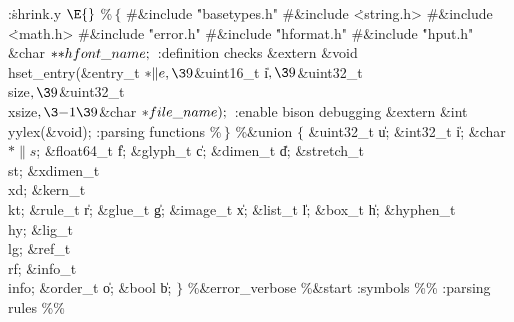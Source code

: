 \Y\B\4:\.{shrink.y }\X${}\E{}$\6
\8\%\raise 1pt\hbox{$\,\{$}\6
\8\#\&{include} \.{"basetypes.h"}\6
\8\#\&{include} \.{<string.h>}\6
\8\#\&{include} \.{<math.h>}\6
\8\#\&{include} \.{"error.h"}\6
\8\#\&{include} \.{"hformat.h"}\6
\8\#\&{include} \.{"hput.h"}\6
\&{char} ${}{*}{*}\index{hfont name+\\{hfont\_name}}\\{hfont\_name};{}$\7
:definition checks\X\7
\&{extern} \&{void} \\{hset\_entry}(\&{entry\_t} ${}{*}\|e,\39{}$\&{uint16\_t} \|i${},\39{}$\&{uint32\_t} \\{size}${},\39{}$\&{uint32\_t} \\{xsize}${},\3{-1}\39{}$\&{char} ${}{*}\index{file name+\\{file\_name}}\\{file\_name});{}$\7
:enable bison debugging\X\7
\&{extern} \&{int} \\{yylex}(\&{void});\7
:parsing functions\X\6
\8\%\raise 1pt\hbox{$\,\}$}\6
\hbox{{\label{union}}}\6
\8\%\&{union} $\{$ \&{uint32\_t} \|u;\5
\&{int32\_t} \|i;\5
\&{char} ${}{*}\|s{}$;\5
\&{float64\_t} \|f;\5
\&{glyph\_t} \|c; \5
\&{dimen\_t} \|d;\5
\&{stretch\_t} \\{st};\5
\&{xdimen\_t} \\{xd};\5
\&{kern\_t} \\{kt};\5
\&{rule\_t} \|r;\5
\&{glue\_t} \|g;\5
\5
\&{image\_t} \|x;\5
\&{list\_t} \|l;\5
\&{box\_t} \|h;\5
\&{hyphen\_t} \\{hy};\5
\&{lig\_t} \\{lg};\5
\&{ref\_t} \\{rf};\5
\&{info\_t} \\{info};\5
\&{order\_t} \|o;\5
\&{bool} \|b;\5
$\}{}$\hbox{{}}\6
\8\%\&{error\_verbose}\6
\8\%\&{start} \6
\hbox{}:symbols\X\6
\hbox{}\6
\8\%\%\6
:parsing rules\X\6
\8\%\%
\Y
\fi


